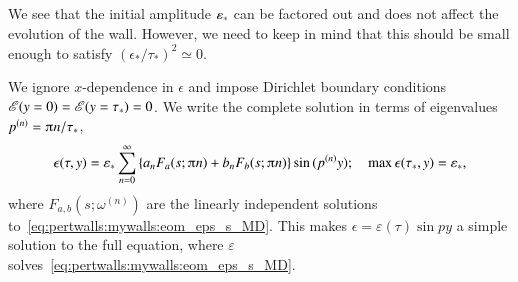     
    


\subsection{}
    We see that the initial amplitude $\varepsilon_\ast$ can be factored out and does not affect the evolution of the wall. However, we need to keep in mind that this should be small enough to satisfy $(\epsilon_\ast/\tau_\ast)^2\simeq 0$. 

    We ignore $x$-dependence in $\epsilon$ and impose Dirichlet boundary conditions $\mathscr{E}(y=0)=\mathscr{E}(y=\tau_\ast)=0$. We write the complete solution in terms of eigenvalues $p^{(n)}= \ppi n/\tau_\ast$, 
    \begin{equation}
        \epsilon(\tau, y) = \epsast  \sum_{n=0}^{\infty} \cclosed{ a_n F_a(s; \ppi n ) + b_n F_b(s; \ppi n)} \sin{ (p^{(n)}y)}; \quad \max{\epsilon(\tau_\ast, y)} = \epsast,
    \end{equation}
    where $F_{a,b}(s; \omega^{(n)})$ are the linearly independent solutions to~\cref{eq:pertwalls:mywalls:eom_eps_s_MD}. This makes $\epsilon = \varepsilon(\tau)\sin{py}$ a simple solution to the full equation, where $\varepsilon$ solves~\cref{eq:pertwalls:mywalls:eom_eps_s_MD}. 







    
    

